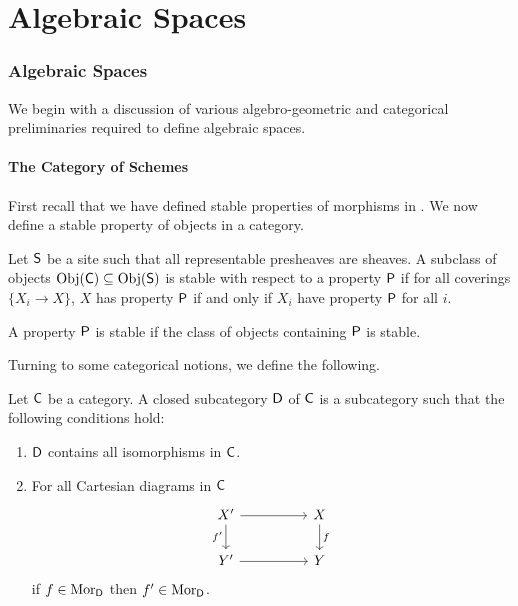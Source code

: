 \part*{Algebraic Spaces}\label{part: algebraic spaces}
\section{Algebraic Spaces}\label{sec: algebraic spaces}
We begin with a discussion of various algebro-geometric and categorical preliminaries required to define algebraic spaces. 
\subsection{The Category of Schemes}
First recall that we have defined stable properties of morphisms in . We now define a stable property of objects in a category. 
\begin{definition}\label{def: stable class of objects}
    Let $\mathsf{S}$ be a site such that all representable presheaves are sheaves. A subclass of objects $\mathrm{Obj}(\mathsf{C})\subseteq\mathrm{Obj}(\mathsf{S})$ is stable with respect to a property $\mathsf{P}$ if for all coverings $\{X_{i}\to X\}$, $X$ has property $\mathsf{P}$ if and only if $X_{i}$ have property $\mathsf{P}$ for all $i$. 
\end{definition}
\begin{definition}\label{def: stable property of objects}
    A property $\mathsf{P}$ is stable if the class of objects containing $\mathsf{P}$ is stable.
\end{definition}
Turning to some categorical notions, we define the following. 
\begin{definition}\label{def: closed subcategory}
    Let $\mathsf{C}$ be a category. A closed subcategory $\mathsf{D}$ of $\mathsf{C}$ is a subcategory such that the following conditions hold:
    \begin{enumerate}[label=(\alph*)]
        \item $\mathsf{D}$ contains all isomorphisms in $\mathsf{C}$.
        \item For all Cartesian diagrams in $\mathsf{C}$
        $$%
        \begin{tikzcd}
            {X'} && X \\
            {Y'} && Y
            \arrow["f", from=1-3, to=2-3]
            \arrow["{f'}"', from=1-1, to=2-1]
            \arrow[from=2-1, to=2-3]
            \arrow[from=1-1, to=1-3]
        \end{tikzcd}$$
        if $f\in\mathrm{Mor}_{\mathsf{D}}$ then $f'\in\mathrm{Mor}_{\mathsf{D}}$.
    \end{enumerate}
\end{definition}
